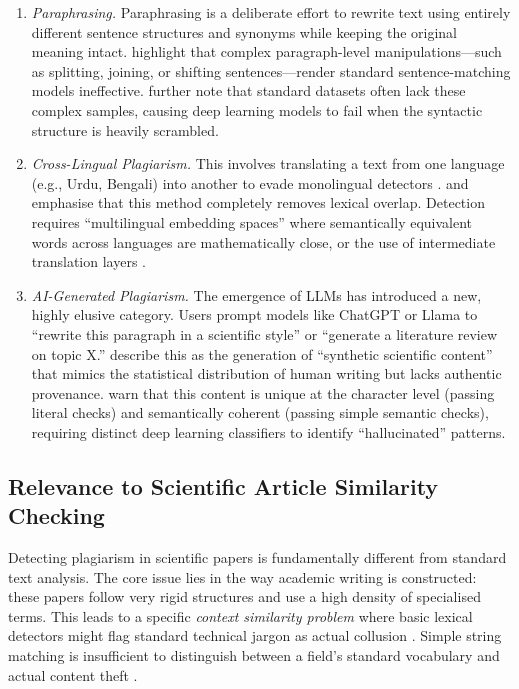 \documentclass[12pt, a4paper]{article}
\begin{document}
\begin{enumerate}
	\item \textit{Paraphrasing.} Paraphrasing is a deliberate effort to rewrite text using entirely different sentence structures and synonyms while keeping the original meaning intact. \citet{Saqaabi2025} highlight that complex paragraph-level manipulations---such as splitting, joining, or shifting sentences---render standard sentence-matching models ineffective. \citet{Zhou2024} further note that standard datasets often lack these complex samples, causing deep learning models to fail when the syntactic structure is heavily scrambled.

	\item \textit{Cross-Lingual Plagiarism.} This involves translating a text from one language (e.g., Urdu, Bengali) into another to evade monolingual detectors \citep{Bouaine2023, Zahid2023}. \citet{Bouaine2023} and \citet{Zahid2023} emphasise that this method completely removes lexical overlap. Detection requires ``multilingual embedding spaces'' where semantically equivalent words across languages are mathematically close, or the use of intermediate translation layers \citep{Islam2023}.

	\item \textit{AI-Generated Plagiarism.} The emergence of LLMs has introduced a new, highly elusive category. Users prompt models like ChatGPT or Llama to ``rewrite this paragraph in a scientific style'' or ``generate a literature review on topic X.'' \citet{Alhijawi2025} describe this as the generation of ``synthetic scientific content'' that mimics the statistical distribution of human writing but lacks authentic provenance. \citet{GreinerPetter2025} warn that this content is unique at the character level (passing literal checks) and semantically coherent (passing simple semantic checks), requiring distinct deep learning classifiers to identify ``hallucinated'' patterns.
\end{enumerate}

\subsection{Relevance to Scientific Article Similarity Checking}

Detecting plagiarism in scientific papers is fundamentally different from standard text analysis. The core issue lies in the way academic writing is constructed: these papers follow very rigid structures and use a high density of specialised terms. This leads to a specific \textit{context similarity problem} where basic lexical detectors might flag standard technical jargon as actual collusion \citep{Lieharyani2025}. Simple string matching is insufficient to distinguish between a field's standard vocabulary and actual content theft \citep{Setu2025}.
\end{document}
